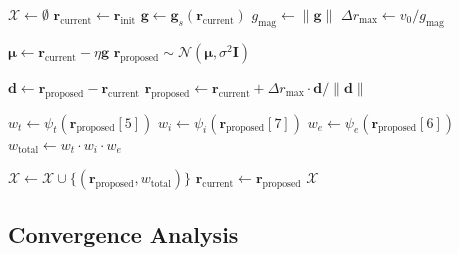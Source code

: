 \documentclass[12pt,a4paper]{article}
\begin{document}
\begin{algorithm}[H]
\caption{Constrained Stochastic Semantic Sampling}
\begin{algorithmic}[1]
\State $\mathcal{X} \leftarrow \emptyset$ 
\State $\mathbf{r}_{\text{current}} \leftarrow \mathbf{r}_{\text{init}}$ 
    \State $\mathbf{g} \leftarrow \mathbf{g}_s(\mathbf{r}_{\text{current}})$ 
    \State $g_{\text{mag}} \leftarrow \|\mathbf{g}\|$ 
    \State $\Delta r_{\max} \leftarrow v_0 / g_{\text{mag}}$ 
    
    \State $\boldsymbol{\mu} \leftarrow \mathbf{r}_{\text{current}} - \eta \mathbf{g}$ 
    \State $\mathbf{r}_{\text{proposed}} \sim \mathcal{N}(\boldsymbol{\mu}, \sigma^2 \mathbf{I})$ 
    
     
        \State $\mathbf{d} \leftarrow \mathbf{r}_{\text{proposed}} - \mathbf{r}_{\text{current}}$
        \State $\mathbf{r}_{\text{proposed}} \leftarrow \mathbf{r}_{\text{current}} + \Delta r_{\max} \cdot \mathbf{d}/\|\mathbf{d}\|$ 
    \EndIf
    
    \State $w_t \leftarrow \psi_t(\mathbf{r}_{\text{proposed}}[5])$ 
    \State $w_i \leftarrow \psi_i(\mathbf{r}_{\text{proposed}}[7])$ 
    \State $w_e \leftarrow \psi_e(\mathbf{r}_{\text{proposed}}[6])$ 
    \State $w_{\text{total}} \leftarrow w_t \cdot w_i \cdot w_e$ 
    
    \State $\mathcal{X} \leftarrow \mathcal{X} \cup \{(\mathbf{r}_{\text{proposed}}, w_{\text{total}})\}$ 
    \State $\mathbf{r}_{\text{current}} \leftarrow \mathbf{r}_{\text{proposed}}$ 
\EndFor
\State \Return $\mathcal{X}$ 
\EndProcedure
\end{algorithmic}
\end{algorithm}

\subsection{Convergence Analysis}
\end{document}
